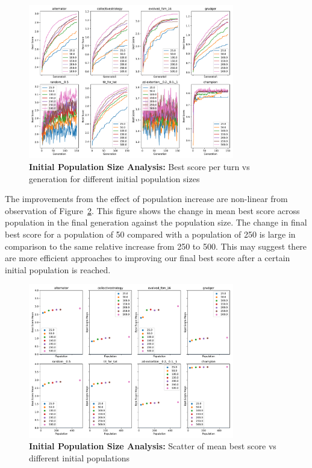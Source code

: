 \begin{figure}[h]
    \includegraphics[width=0.8\textwidth, keepaspectratio, center]{./img/plots/INIT_POP_bs_v_gens_all.pdf}
    \caption{\textbf{Initial Population Size Analysis:} Best score per turn vs generation for different initial population sizes}\label{fig:INIT-POP-bs-v-gens-all}
\end{figure}

The improvements from the effect of population increase are non-linear from observation of Figure~\ref{fig:INIT-POP-mean-bs-v-init-pop-all}.
This figure shows the change in mean best score across population in the final generation against the population size.
The change in final best score for a population of 50 compared with a population of 250 is large in comparison to the same relative increase from 250 to 500.
This may suggest there are more efficient approaches to improving our final best score after a certain initial population is reached.

\begin{figure}[h]
    \includegraphics[width=0.8\textwidth, keepaspectratio, center]{./img/plots/INIT_POP_mean_bs_diff_v_init_pop_all.pdf}
    \caption{\textbf{Initial Population Size Analysis:} Scatter of mean best score vs different initial populations}\label{fig:INIT-POP-mean-bs-v-init-pop-all}
\end{figure}


